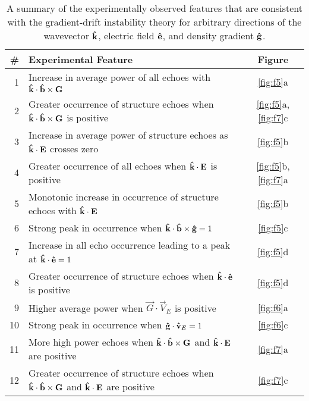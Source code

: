 \begin{table}
\caption{A summary of the experimentally observed features that are consistent with the gradient-drift instability theory for arbitrary directions of the wavevector $\mathbf{\hat{k}}$, electric field $\mathbf{\hat{e}}$, and density gradient $\mathbf{\hat{g}}$.}
\label{tab:results}
\centering
\begin{tabular}{|r|l|c|}
	\hline
	\textbf{\#}& \textbf{Experimental Feature} & \textbf{Figure} \\
	\hline
	1&Increase in average power of all echoes with \(\mathbf{\hat{k}}\cdot\mathbf{\hat{b}}\times\mathbf{G}\) & \ref{fig:f5}a \\
	2&Greater occurrence of structure echoes when \(\mathbf{\hat{k}}\cdot\mathbf{\hat{b}}\times\mathbf{G}\) is positive & \ref{fig:f5}a, \ref{fig:f7}c \\
	3&Increase in average power of structure echoes as \(\mathbf{\hat{k}}\cdot\mathbf{E}\) crosses zero & \ref{fig:f5}b \\
	4&Greater occurrence of all echoes when \(\mathbf{\hat{k}}\cdot\mathbf{E}\) is positive & \ref{fig:f5}b, \ref{fig:f7}a \\
	5&Monotonic increase in occurrence of structure echoes with \(\mathbf{\hat{k}}\cdot\mathbf{E}\) & \ref{fig:f5}b \\
	6&Strong peak in occurrence when \(\mathbf{\hat{k}}\cdot\mathbf{\hat{b}}\times\mathbf{\hat{g}} = 1\) & \ref{fig:f5}c \\
	7&Increase in all echo occurrence leading to a peak at \(\mathbf{\hat{k}}\cdot\mathbf{\hat{e}}=1\) & \ref{fig:f5}d \\
	8&Greater occurrence of structure echoes when \(\mathbf{\hat{k}}\cdot\mathbf{\hat{e}}\) is positive & \ref{fig:f5}d \\
	9&Higher average power when \(\vec{G}\cdot\vec{V}_E\) is positive & \ref{fig:f6}a \\
	10&Strong peak in occurrence when \(\mathbf{\hat{g}}\cdot\mathbf{\hat{v}}_E = 1\) & \ref{fig:f6}c \\
	11&More high power echoes when \(\mathbf{\hat{k}}\cdot\mathbf{\hat{b}}\times\mathbf{G}\) and \(\mathbf{\hat{k}}\cdot\mathbf{E}\) are positive & \ref{fig:f7}a \\
	12&Greater occurrence of structure echoes when \(\mathbf{\hat{k}}\cdot\mathbf{\hat{b}}\times\mathbf{G}\) and \(\mathbf{\hat{k}}\cdot\mathbf{E}\) are positive & \ref{fig:f7}c \\
	\hline
\end{tabular}
\end{table}

